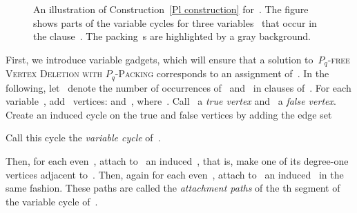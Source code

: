 \documentclass[envcountsame,numbook,smallextended]{svjour3}
\numberwithin{equation}{section}
\numberwithin{figure}{section}
\newcommand{\PLVD}{\textsc{\ensuremath{P_q}-free Vertex Deletion with  \ensuremath{P_q}-Packing}}
\begin{document}
\begin{construction}
\begin{figure}[t]

  \caption{An illustration of Construction~\ref{Pl construction} for~. The figure shows parts of the variable cycles for three variables~ that occur in the clause~. The packing~s are highlighted by a gray background.}
  \label{fig:pq-cons}

\end{figure}  


  First,
  we introduce variable gadgets,
  which will ensure that a solution to~\PLVD{}
  corresponds to an assignment of~.
  In the following,
  let ~denote
  the number of occurrences of~ and~
  in clauses of~.
  For each variable~, add~ vertices:
   and~,
  where~.
  Call~ a \emph{true vertex}
  and~ a \emph{false vertex}.
  Create an induced cycle on the true and false vertices
  by adding the edge set
  
  Call this cycle the \emph{variable cycle} of~.
  
  Then, for each even~,
  attach to~ an induced~, that is,
  make one of its degree-one vertices adjacent to~.
  Then, again for each even~,
  attach to~ an induced~
  in the same fashion.
  These paths are called
  the \emph{attachment paths} of the th segment
  of the variable cycle of~.
  

\end{construction}
\end{document}
